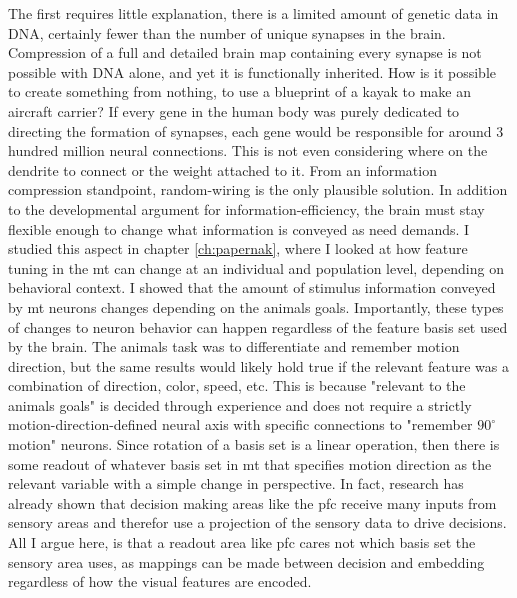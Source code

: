 The first requires little explanation, there is a limited amount of genetic data in DNA, certainly fewer than the number of unique synapses in the brain. Compression of a full and detailed brain map containing every synapse is not possible with DNA alone, and yet it is functionally inherited. How is it possible to create something from nothing, to use a blueprint of a kayak to make an aircraft carrier? If every gene in the human body was purely dedicated to directing the formation of synapses, each gene would be responsible for around 3 hundred million neural connections. This is not even considering where on the dendrite to connect or the weight attached to it. From an information compression standpoint, random-wiring is the only plausible solution. In addition to the developmental argument for information-efficiency, the brain must stay flexible enough to change what information is conveyed as need demands. I studied this aspect in chapter \ref{ch:papernak}, where I looked at how feature tuning in the \gls{mt} can change at an individual and population level, depending on behavioral context. I showed that the amount of stimulus information conveyed by \gls{mt} neurons changes depending on the animals goals. Importantly, these types of changes to neuron behavior can happen regardless of the feature basis set used by the brain. The animals task was to differentiate and remember motion direction, but the same results would likely hold true if the relevant feature was a combination of direction, color, speed, etc. This is because "relevant to the animals goals" is decided through experience and does not require a strictly motion-direction-defined neural axis with specific connections to "remember $90^\circ$ motion" neurons. Since rotation of a basis set is a linear operation, then there is some readout of whatever basis set in \gls{mt} that specifies motion direction as the relevant variable with a simple change in perspective. In fact, research has already shown that decision making areas like the \gls{pfc} receive many inputs from sensory areas and therefor use a projection of the sensory data to drive decisions. All I argue here, is that a readout area like \gls{pfc} cares not which basis set the sensory area uses, as mappings can be made between decision and embedding regardless of how the visual features are encoded.

